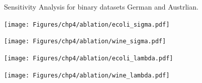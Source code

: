 \documentclass[12pt,a4paper,oneside,english]{report}
\begin{document}
\begin{figure}[t!]
\begin{minipage}[t]{0.5\textwidth}
        \label{fig:german_gamma}
    \end{minipage}

    \caption{Sensitivity Analysis for binary datasets German and Austrlian.}
    \label{sens_binary}
\end{figure}

\begin{figure}[t!] %
    \centering
    \begin{minipage}[t]{0.5\textwidth}
        \centering
        \texttt{[image: Figures/chp4/ablation/ecoli\_sigma.pdf]}
    \end{minipage}%
    \begin{minipage}[t]{0.5\textwidth}
        \centering
        \texttt{[image: Figures/chp4/ablation/wine\_sigma.pdf]}
        \label{fig:wine_kernel}
    \end{minipage}
    \vspace{0.5cm} %

    \begin{minipage}[t]{0.5\textwidth}
        \centering
        \texttt{[image: Figures/chp4/ablation/ecoli\_lambda.pdf]}
        \label{fig:ecoli_lambda}
    \end{minipage}%
    \begin{minipage}[t]{0.5\textwidth}
        \centering
        \texttt{[image: Figures/chp4/ablation/wine\_lambda.pdf]}
        \label{fig:wine_lambda}
    \end{minipage}
    \vspace{0.5cm}


\end{figure}
\end{document}
